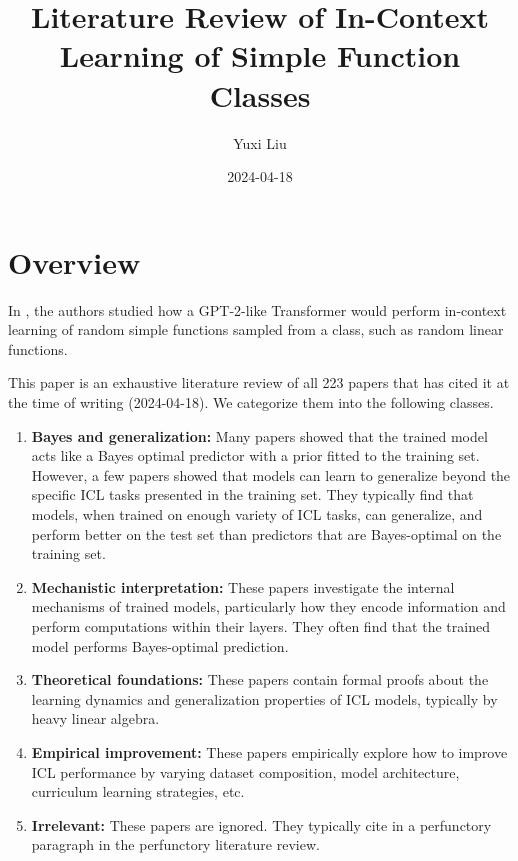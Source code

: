 \documentclass[12pt]{article}
\begin{document}
\title{Literature Review of In-Context Learning of Simple Function Classes}
\author{Yuxi Liu}

\date{2024-04-18}
\maketitle


\section{Overview}

In \cite{gargWhatCanTransformers2022}, the authors studied how a GPT-2-like Transformer would perform in-context learning of random simple functions sampled from a class, such as random linear functions. 

This paper is an exhaustive literature review of all 223 papers that has cited it at the time of writing (2024-04-18). We categorize them into the following classes.

\begin{enumerate}
	\item \textbf{Bayes and generalization:} Many papers showed that the trained model acts like a Bayes optimal predictor with a prior fitted to the training set. However, a few papers showed that models can learn to generalize beyond the specific ICL tasks presented in the training set. They typically find that models, when trained on enough variety of ICL tasks, can generalize, and perform better on the test set than predictors that are Bayes-optimal on the training set.
	\item \textbf{Mechanistic interpretation:} These papers investigate the internal mechanisms of trained models, particularly how they encode information and perform computations within their layers. They often find that the trained model performs Bayes-optimal prediction.
	\item \textbf{Theoretical foundations:} These papers contain formal proofs about the learning dynamics and generalization properties of ICL models, typically by heavy linear algebra.
	\item \textbf{Empirical improvement:} These papers empirically explore how to improve ICL performance by varying dataset composition, model architecture, curriculum learning strategies, etc.
	\item \textbf{Irrelevant:} These papers are ignored. They typically cite \cite{gargWhatCanTransformers2022} in a perfunctory paragraph in the perfunctory literature review.
\end{enumerate}
\end{document}
